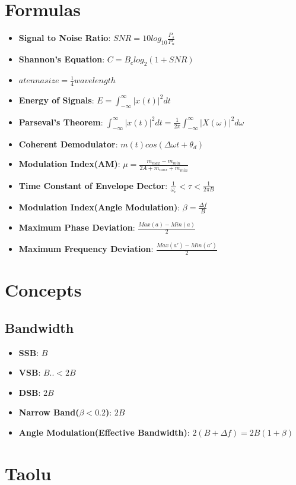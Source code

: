 \documentclass{article}
\begin{document}
\Large
     \section{Formulas}
     \begin{itemize}
        \item \textbf{Signal to Noise Ratio}: $SNR = 10log_{10}\frac{P_s}{P_n}$
        \item \textbf{Shannon's Equation}: $C = B_clog_2(1+SNR)$
        \item $atenna size = \frac{1}{4}wavelength$
        \item \textbf{Energy of Signals}: $E = \int_{-\infty} ^{\infty} |x(t)|^2dt$
        \item \textbf{Parseval's Theorem}:  $\int_{-\infty} ^{\infty} |x(t)|^2dt = \frac{1}{2\pi}\int_{-\infty}^{\infty}|X(\omega)|^2d\omega$
        \item \textbf{Coherent Demodulator}: $m(t)cos(\Delta \omega t + \theta_d)$
        \item \textbf{Modulation Index(AM)}: $\mu = \frac{m_{max} - m_{min}}{2A + m_{max} + m_{min}}$
        \item \textbf{Time Constant of Envelope Dector}: $\frac{1}{\omega_c}<\tau<\frac{1}{2\pi B}$
        
        \item \textbf{Modulation Index(Angle Modulation)}: $\beta = \frac{\Delta f}{B}$
        \item \textbf{Maximum Phase Deviation}: $\frac{Max(a) - Min(a)}{2}$
        \item \textbf{Maximum Frequency Deviation}: $\frac{Max(a')- Min(a')}{2}$
        
     \end{itemize}
     
     
     \section{Concepts}
     \subsection{Bandwidth}
        \begin{itemize}
          \item \textbf{SSB}: $B$
          \item \textbf{VSB}: $B..<2B$
          \item \textbf{DSB}: $2B$
          \item \textbf{Narrow Band($\beta < 0.2$)}: $2B$
          \item\textbf{Angle Modulation(Effective Bandwidth)}: $2(B + \Delta f) = 2B(1+\beta)$
        \end{itemize}
     \section{Taolu}
\end{document}
